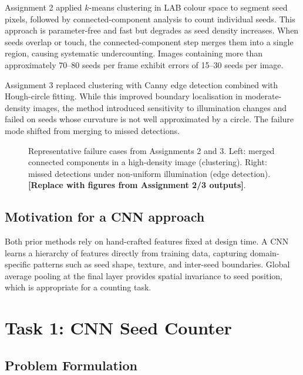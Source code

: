 \documentclass[11pt,a4paper]{article}
\begin{document}
Assignment 2 applied $k$-means clustering in LAB colour space to segment seed pixels,
followed by connected-component analysis to count individual seeds. This approach is
parameter-free and fast but degrades as seed density increases. When seeds overlap or
touch, the connected-component step merges them into a single region, causing systematic
undercounting. Images containing more than approximately 70--80 seeds per frame exhibit
errors of 15--30 seeds per image.

Assignment 3 replaced clustering with Canny edge detection combined with Hough-circle
fitting. While this improved boundary localisation in moderate-density images, the method
introduced sensitivity to illumination changes and failed on seeds whose curvature is not
well approximated by a circle. The failure mode shifted from merging to missed detections.

\begin{figure}[h]
\centering
\fbox{\rule{0pt}{3cm}\rule{8cm}{0pt}}
\caption{Representative failure cases from Assignments 2 and 3. Left: merged connected
components in a high-density image (clustering). Right: missed detections under
non-uniform illumination (edge detection). \textbf{[Replace with figures from
Assignment 2/3 outputs]}.}
\label{fig:failure_prior}
\end{figure}

\subsection{Motivation for a CNN approach}

Both prior methods rely on hand-crafted features fixed at design time. A CNN learns a
hierarchy of features directly from training data, capturing domain-specific patterns
such as seed shape, texture, and inter-seed boundaries. Global average pooling at the
final layer provides spatial invariance to seed position, which is appropriate for a
counting task.

\section{Task 1: CNN Seed Counter}

\subsection{Problem Formulation}
\end{document}
